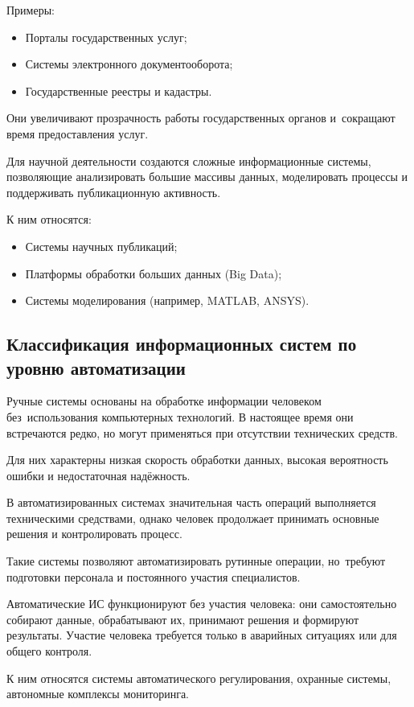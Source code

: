 \documentclass{ou}
\begin{document}
Примеры:
\begin{itemize}[label=-, itemindent=4em, nosep]
\item Порталы государственных услуг;
\item Системы электронного документооборота;
\item Государственные реестры и кадастры.
\end{itemize}

Они увеличивают прозрачность работы государственных органов и~сокращают время предоставления услуг.

Для научной деятельности создаются сложные информационные системы, позволяющие анализировать большие массивы данных, моделировать процессы и поддерживать публикационную активность.

К ним относятся:
\begin{itemize}[label=-, itemindent=4em, nosep]
\item Системы научных публикаций;
\item Платформы обработки больших данных (Big Data);
\item Системы моделирования (например, MATLAB, ANSYS).
\end{itemize}
\subsection{Классификация информационных систем по уровню автоматизации}
Ручные системы основаны на обработке информации человеком без~использования компьютерных технологий. В настоящее время они встречаются редко, но могут применяться при отсутствии технических средств.

Для них характерны низкая скорость обработки данных, высокая вероятность ошибки и недостаточная надёжность.

В автоматизированных системах значительная часть операций выполняется техническими средствами, однако человек продолжает принимать основные решения и контролировать процесс.

Такие системы позволяют автоматизировать рутинные операции, но~требуют подготовки персонала и постоянного участия специалистов.

Автоматические ИС функционируют без участия человека: они самостоятельно собирают данные, обрабатывают их, принимают решения и формируют результаты. Участие человека требуется только в аварийных ситуациях или для общего контроля.

К ним относятся системы автоматического регулирования, охранные системы, автономные комплексы мониторинга.
\end{document}
